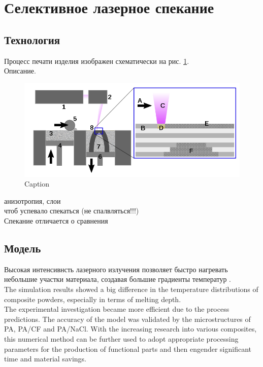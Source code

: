 \section{Селективное лазерное спекание}
\subsection{Технология}
Процесс печати изделия изображен схематически на рис. \ref{fig:printer}.\\
Описание. 

\begin{figure}[h]
    \centering
    \includegraphics[width=\linewidth]{fig/sls.png}
    \caption{Caption}
    \label{fig:printer}
\end{figure}
анизотропия, слои\\
чтоб успевало спекаться (не спалвляться!!!)\\
Спекание отличается о сравнения

\subsection{Модель}
Высокая интенсивнсть лазерного излучения позволяет быстро нагревать небольшие участки материала, создавая большие градиенты температур \cite{sls-sim2016}.
\\

The simulation
results showed a big difference in the temperature distributions
of composite powders, especially in terms of melting depth.\\
The experimental investigation became more
efficient due to the process predictions. The accuracy of the model
was validated by the microstructures of PA, PA/CF and PA/NaCl.
With the increasing research into various composites, this numerical
method can be further used to adopt appropriate processing
parameters for the production of functional parts and then engender
significant time and material savings.
